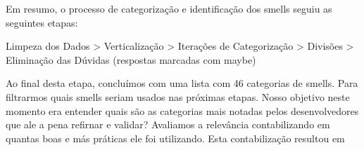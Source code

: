 Em resumo, o processo de categoriza\c{c}\~ao e identifica\c{c}\~ao dos smells seguiu as seguintes etapas:

Limpeza dos Dados > Verticaliza\c{c}\~ao > Itera\c{c}\~oes de Categoriza\c{c}\~ao > Divis\~oes > Elimina\c{c}\~ao das D\'uvidas (respostas marcadas com maybe)

Ao final desta etapa, concluímos com uma lista com 46 categorias de smells. Para filtrarmos quais smells seriam usados nas pr\'oximas etapas. Nosso objetivo neste momento era entender quais s\~ao as categorias mais notadas pelos desenvolvedores que ale a pena refirnar e validar? Avaliamos a relevância contabilizando em quantas boas e m\'as pr\'aticas ele foi utilizando. Esta contabiliza\c{c}\~ao resultou em